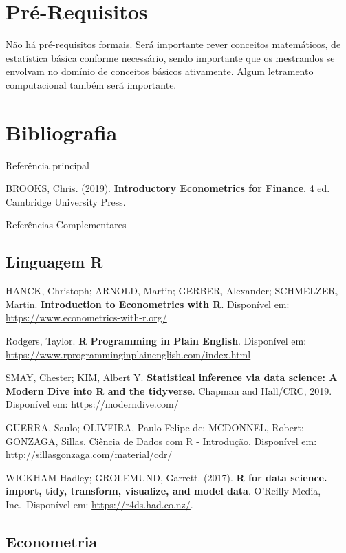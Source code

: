 \documentclass[11pt,]{article}
\begin{document}
\hypertarget{pruxe9-requisitos}{%
\section{Pré-Requisitos}\label{pruxe9-requisitos}}

Não há pré-requisitos formais. Será importante rever conceitos
matemáticos, de estatística básica conforme necessário, sendo importante
que os mestrandos se envolvam no domínio de conceitos básicos
ativamente. Algum letramento computacional também será importante.

\hypertarget{bibliografia}{%
\section{Bibliografia}\label{bibliografia}}

Referência principal

BROOKS, Chris. (2019). \textbf{Introductory Econometrics for Finance}. 4
ed. Cambridge University Press.

Referências Complementares

\hypertarget{linguagem-r}{%
\subsection{Linguagem R}\label{linguagem-r}}

HANCK, Christoph; ARNOLD, Martin; GERBER, Alexander; SCHMELZER, Martin.
\textbf{Introduction to Econometrics with R}. Disponível em:
\url{https://www.econometrics-with-r.org/}

Rodgers, Taylor. \textbf{R Programming in Plain English}. Disponível em:
\url{https://www.rprogramminginplainenglish.com/index.html}

SMAY, Chester; KIM, Albert Y. \textbf{Statistical inference via data
science: A Modern Dive into R and the tidyverse}. Chapman and Hall/CRC,
2019. Disponível em: \url{https://moderndive.com/}

GUERRA, Saulo; OLIVEIRA, Paulo Felipe de; MCDONNEL, Robert; GONZAGA,
Sillas. Ciência de Dados com R - Introdução. Disponível em:
\url{http://sillasgonzaga.com/material/cdr/}

WICKHAM Hadley; GROLEMUND, Garrett. (2017). \textbf{R for data science.
import, tidy, transform, visualize, and model data}. O'Reilly Media,
Inc.~Disponível em: \url{https://r4ds.had.co.nz/}.

\hypertarget{econometria}{%
\subsection{Econometria}\label{econometria}}
\end{document}
